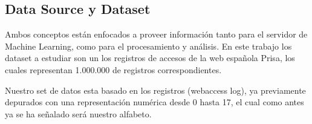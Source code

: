 \subsection{Data Source y Dataset }

	Ambos conceptos están enfocados a proveer información tanto para el servidor de Machine Learning, como para el procesamiento y análisis.
	En este trabajo los dataset a estudiar son un los registros de accesos de la web española Prisa, los cuales representan 1.000.000 de registros correspondientes.

	Nuestro set de  datos esta basado en los registros (webaccess log), ya previamente depurados con una representación numérica desde 0 hasta 17, el cual como antes ya se ha señalado será nuestro alfabeto. 



 















